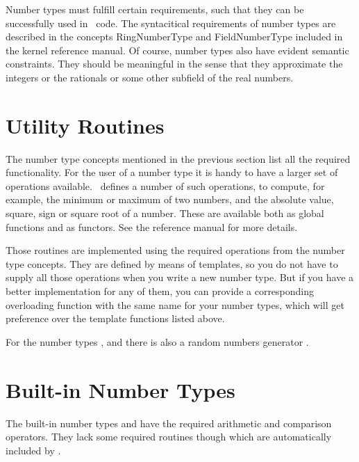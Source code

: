 Number types must fulfill certain requirements, such that they can
be successfully used in \cgal\ code.  The syntacitical requirements of
number types are described in
the concepts RingNumberType and FieldNumberType included in the 
kernel reference manual.
Of course, number types also
have evident semantic constraints. They should be meaningful in the
sense that they approximate the integers or the rationals 
or some other subfield of the real numbers.

\section{Utility Routines}

The number type concepts mentioned in the previous section list all 
the required functionality.
For the user of a number type it is handy to have a larger set of
operations available. \cgal\ defines a number of such operations,
to compute, for example, the minimum or maximum of two numbers, and the
absolute value, square, sign or square root of a number.  These are
available both as global functions and as functors.  See the reference
manual for more details.

Those routines are implemented using the required operations from the
number type concepts. They are defined by means of templates, so you do not
have to supply all those operations when you write  a new number type.
But if you have a better implementation for any of them, you can provide a 
corresponding overloading function with the same name for your number types,
which will get preference over the template functions listed above.

For the number types , and  there is
also a random numbers generator .

\section{Built-in Number Types}

The built-in number types  and  have the
required arithmetic and comparison operators. They lack some required
routines though which are automatically included by \cgal.

